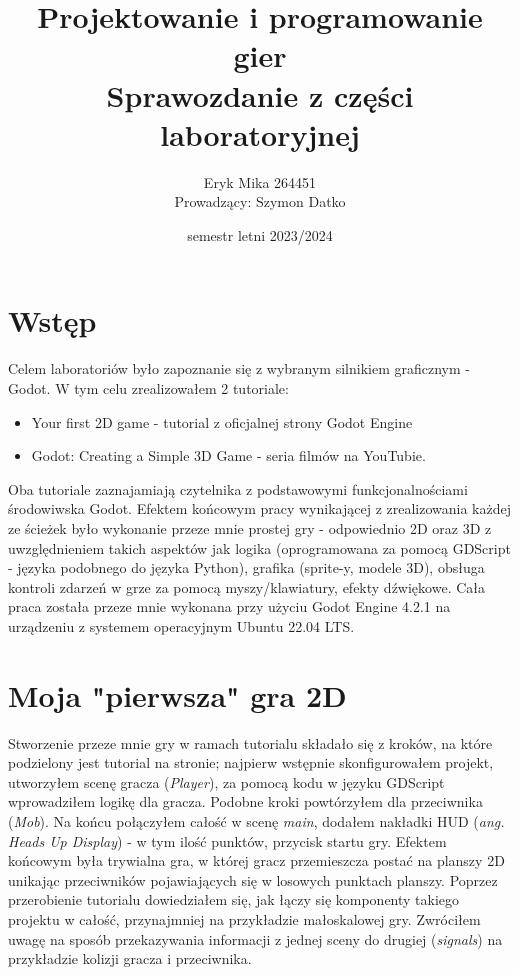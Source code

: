 \documentclass[a4paper]{article}
\title{Projektowanie i programowanie gier \\
\vspace{5px}
\large Sprawozdanie z części laboratoryjnej }
\date{semestr letni 2023/2024}
\author{
    \centering
    \begin{tabular}{c}
      Eryk Mika 264451  \\[2ex]
      Prowadzący: Szymon Datko
    \end{tabular}
  }
\begin{document}
\maketitle
\renewcommand{\figurename}{Zrzut}
\begin{sloppypar}
	\section{Wstęp}
	\justifying
	Celem laboratoriów było zapoznanie się z wybranym silnikiem graficznym - Godot. W tym celu zrealizowałem 2 tutoriale:
	\begin{itemize}
		\item Your first 2D game - tutorial z oficjalnej strony Godot Engine
		\item Godot: Creating a Simple 3D Game - seria filmów na YouTubie.
	\end{itemize}
	Oba tutoriale zaznajamiają czytelnika z podstawowymi funkcjonalnościami środowiwska Godot. Efektem końcowym pracy wynikającej
	z zrealizowania każdej ze ścieżek było wykonanie przeze mnie prostej gry - odpowiednio 2D oraz 3D z uwzględnieniem takich
	aspektów jak logika (oprogramowana za pomocą GDScript - języka podobnego do języka Python), grafika (sprite-y, modele 3D),
	obsługa kontroli zdarzeń w grze za pomocą myszy/klawiatury, efekty dźwiękowe. Cała praca została przeze mnie wykonana przy
	użyciu Godot Engine 4.2.1 na urządzeniu z systemem operacyjnym Ubuntu 22.04 LTS.
	\section{Moja "pierwsza" gra 2D}
	Stworzenie przeze mnie gry w ramach tutorialu składało się z kroków, na które podzielony jest tutorial na stronie; najpierw
	wstępnie skonfigurowałem projekt, utworzyłem scenę gracza (\emph{Player}), za pomocą kodu w języku GDScript wprowadziłem
	logikę dla gracza. Podobne kroki powtórzyłem dla przeciwnika (\emph{Mob}). Na końcu połączyłem całość w scenę \emph{main},
	dodałem nakładki HUD (\emph{ang. Heads Up Display}) - w tym ilość punktów, przycisk startu gry. Efektem końcowym była trywialna gra,
	w której gracz przemieszcza postać na planszy 2D unikając przeciwników pojawiających się w losowych punktach planszy.
	Poprzez przerobienie tutorialu dowiedziałem się, jak łączy się komponenty takiego projektu w całość, przynajmniej na przykładzie małoskalowej gry.
	Zwróciłem uwagę na sposób przekazywania informacji z jednej sceny do drugiej (\emph{signals}) na przykładzie kolizji gracza i przeciwnika.

\end{sloppypar}
\end{document}
